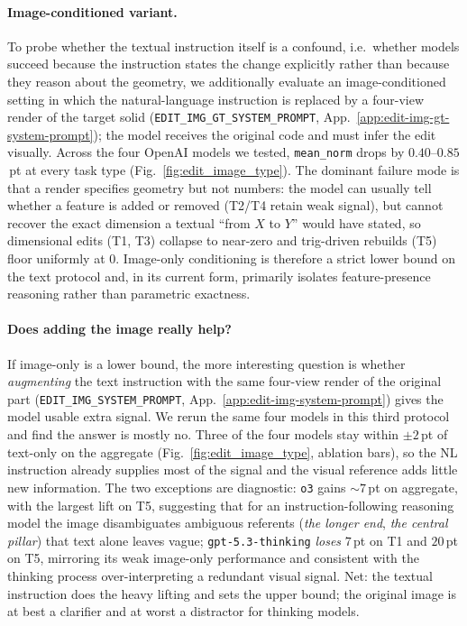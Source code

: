 \paragraph{Image-conditioned variant.} To probe whether the textual instruction itself is a confound, i.e.\ whether models succeed because the instruction states the change explicitly rather than because they reason about the geometry, we additionally evaluate an image-conditioned setting in which the natural-language instruction is replaced by a four-view render of the target solid (\texttt{EDIT\_IMG\_GT\_SYSTEM\_PROMPT}, App.~\ref{app:edit-img-gt-system-prompt}); the model receives the original code and must infer the edit visually. Across the four OpenAI models we tested, \texttt{mean\_norm} drops by $0.40$--$0.85$\,pt at every task type (Fig.~\ref{fig:edit_image_type}). The dominant failure mode is that a render specifies geometry but not numbers: the model can usually tell whether a feature is added or removed (T2/T4 retain weak signal), but cannot recover the exact dimension a textual ``from $X$ to $Y$'' would have stated, so dimensional edits (T1, T3) collapse to near-zero and trig-driven rebuilds (T5) floor uniformly at $0$. Image-only conditioning is therefore a strict lower bound on the text protocol and, in its current form, primarily isolates feature-presence reasoning rather than parametric exactness.

\paragraph{Does adding the image really help?} If image-only is a lower bound, the more interesting question is whether \emph{augmenting} the text instruction with the same four-view render of the original part (\texttt{EDIT\_IMG\_SYSTEM\_PROMPT}, App.~\ref{app:edit-img-system-prompt}) gives the model usable extra signal. We rerun the same four models in this third protocol and find the answer is mostly no. Three of the four models stay within $\pm 2$\,pt of text-only on the aggregate (Fig.~\ref{fig:edit_image_type}, ablation bars), so the NL instruction already supplies most of the signal and the visual reference adds little new information. The two exceptions are diagnostic: \texttt{o3} gains $\sim 7$\,pt on aggregate, with the largest lift on T5, suggesting that for an instruction-following reasoning model the image disambiguates ambiguous referents (\emph{the longer end}, \emph{the central pillar}) that text alone leaves vague; \texttt{gpt-5.3-thinking} \emph{loses} $7$\,pt on T1 and $20$\,pt on T5, mirroring its weak image-only performance and consistent with the thinking process over-interpreting a redundant visual signal. Net: the textual instruction does the heavy lifting and sets the upper bound; the original image is at best a clarifier and at worst a distractor for thinking models.


